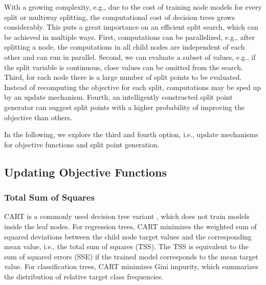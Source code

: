 \documentclass[a4paper, 11pt]{article}
\begin{document}
\par
With a growing complexity, e.g., due to the cost of training node models for every split or multiway splitting, the computational cost of decision trees grows considerably. This puts a great importance on an efficient split search, which can be achieved in multiple ways.
First, computations can be parallelized, e.g., after splitting a node, the computations in all child nodes are independent of each other and can run in parallel.
Second, we can evaluate a subset of values, e.g., if the split variable is continuous, close values can be omitted from the search.
Third, for each node there is a large number of split points to be evaluated. Instead of recomputing the objective for each split, computations may be sped up by an update mechanism.
Fourth, an intelligently constructed split point generator can suggest split points with a higher probability of improving the objective than others.
\par
In the following, we explore the third and fourth option, i.e., update mechanisms for objective functions and split point generation.

\subsection{Updating Objective Functions}

\subsubsection{Total Sum of Squares}
CART is a commonly used decision tree variant \cite{hastie_elemstatlearn}, which does not train models inside the leaf nodes. For regression trees, CART minimizes the weighted sum of squared deviations between the child node target values and the corresponding mean value, i.e., the total sum of squares (TSS). The TSS is equivalent to the sum of squared errors (SSE) if the trained model corresponds to the mean target value.
For classification trees, CART minimizes Gini impurity, which summarizes the distribution of relative target class frequencies. 
\end{document}
